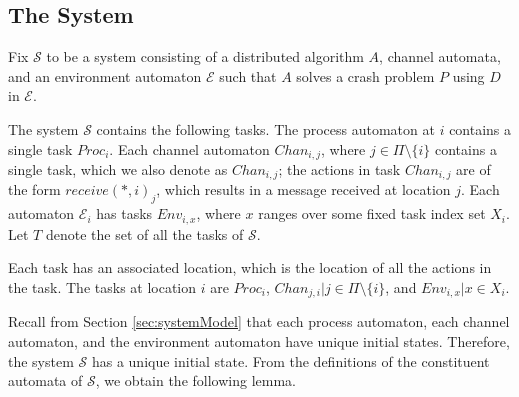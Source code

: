 \documentclass[11pt]{article}
\numberwithin{theorem}{section}
\begin{document}
\subsection{The System}\label{subsec:TreeExecutionSystem}

Fix $\mathcal{S}$ to be a system consisting of a distributed algorithm $A$, channel
automata, and an environment automaton $\mathcal{E}$ such that $A$ solves
a crash problem $P$ using $D$ in $\mathcal{E}$. 


The system $\mathcal{S}$ contains the following tasks.
The process automaton at $i$ contains a single task $Proc_i$. 
Each channel automaton $Chan_{i,j}$, where $j \in \Pi \setminus \{i\}$
contains a single task, which we also denote as $Chan_{i,j}$;  the actions in task $Chan_{i,j}$ are of the form $receive(*,i)_j$, which results in a message received at location $j$. 
Each automaton $\mathcal{E}_i$ has tasks $Env_{i,x}$, where $x$ ranges
over some fixed task index set $X_i$.
Let $T$ denote the set of all the tasks of $\mathcal{S}$.

Each task has an associated location, which is the location of all the
actions in the task.
The tasks at location $i$ are $Proc_i$, $Chan_{j,i}| j \in \Pi \setminus \{i\}$, 
and $Env_{i,x} |x \in X_i$.


Recall from Section \ref{sec:systemModel} that each process automaton, each channel automaton, and the environment automaton have unique initial states. Therefore, the system $\mathcal{S}$ has a unique initial state. From the definitions of the constituent automata of $\mathcal{S}$, we obtain the following lemma.
\end{document}
